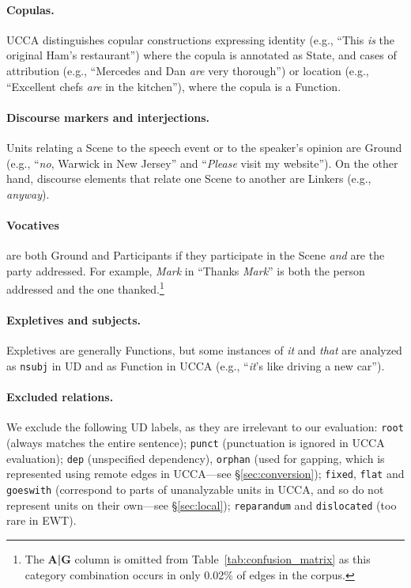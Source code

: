 \documentclass[11pt,a4paper,table]{article}
\begin{document}
\paragraph{Copulas.}
    UCCA distinguishes copular constructions expressing
    identity (e.g., ``This \textit{is} the original Ham's restaurant'') where the copula is annotated as State,
    and cases of attribution 
    (e.g., ``Mercedes and Dan \textit{are} very thorough'')
    or location (e.g., ``Excellent chefs \textit{are} in the kitchen''),
    where the copula is a Function.

\paragraph{Discourse markers and interjections.}
    Units relating a Scene to the speech event or to the speaker's opinion are Ground
    (e.g., ``\textit{no}, Warwick in New Jersey'' and ``\textit{Please} visit my website'').
    On the other hand, discourse elements that relate one Scene to another 
    are Linkers (e.g., \textit{anyway}).

\paragraph{Vocatives}
    are both Ground and Participants if they participate in the Scene \textit{and} are the party addressed.
    For example, \textit{Mark} in ``Thanks \textit{Mark}'' is both the person addressed and the one thanked.\footnote{The {\bf A\big|G} column is omitted from
    Table~\ref{tab:confusion_matrix} as this category combination
    occurs in only 0.02\% of edges in the corpus.}
    
\paragraph{Expletives and subjects.}
    Expletives are generally Functions,
    but some instances of \textit{it} and \textit{that} are analyzed as \texttt{nsubj} in UD
    and as Function in UCCA (e.g., ``\textit{it}'s like driving a new car'').

\paragraph{Excluded relations.}
We exclude the following UD labels,
as they are irrelevant to our evaluation:
\texttt{root} (always matches the entire sentence);
\texttt{punct} (punctuation is ignored in UCCA evaluation);
\texttt{dep} (unspecified dependency),
\texttt{orphan} (used for gapping, which is represented using remote edges in UCCA---see \S\ref{sec:conversion});
\texttt{fixed}, \texttt{flat} and \texttt{goeswith} (correspond to parts of unanalyzable units in UCCA,
    and so do not represent units on their own---see \S\ref{sec:local});
    \texttt{reparandum} and \texttt{dislocated} (too rare in EWT).
    
\end{document}
